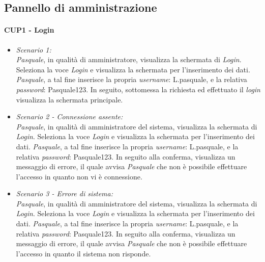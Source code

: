 \subsection{Pannello di amministrazione}
\paragraph{CUP1 - Login \\}
\begin{itemize}
	
	\item \textit{Scenario 1:\\}
	\textit{Pasquale}, in qualità di amministratore, visualizza la schermata di \textit{Login}. Seleziona la voce \textit{Login} e visualizza la schermata per l’inserimento dei dati. \textit{Pasquale}, a tal fine inserisce la propria \textit{username}: L.pasquale, e la relativa \textit{password}: Pasquale123. In seguito, sottomessa la richiesta ed effettuato il \textit{login} visualizza la schermata principale.\\
	
	\item \textit{Scenario 2 - Connessione assente:\\}
	\textit{Pasquale}, in qualità di amministratore del sistema, visualizza la schermata di \textit{Login}. Seleziona la voce \textit{Login} e visualizza la schermata per l’inserimento dei dati. \textit{Pasquale}, a tal fine inserisce la propria \textit{username}: L.pasquale, e la relativa \textit{password}: Pasquale123. In seguito alla conferma, visualizza un messaggio di errore, il quale avvisa \textit{Pasquale} che non è possibile effettuare l’accesso in quanto non vi è connessione.\\
	
	\item \textit{Scenario 3 - Errore di sistema:\\}
	\textit{Pasquale}, in qualità di amministratore del sistema, visualizza la schermata di \textit{Login}. Seleziona la voce \textit{Login} e visualizza la schermata per l’inserimento dei dati. \textit{Pasquale}, a tal fine inserisce la propria \textit{username}: L.pasquale, e la relativa \textit{password}: Pasquale123. In seguito alla conferma, visualizza un messaggio di errore, il quale avvisa \textit{Pasquale} che non è possibile effettuare l’accesso in quanto il sistema non risponde.\\
	

\end{itemize}
